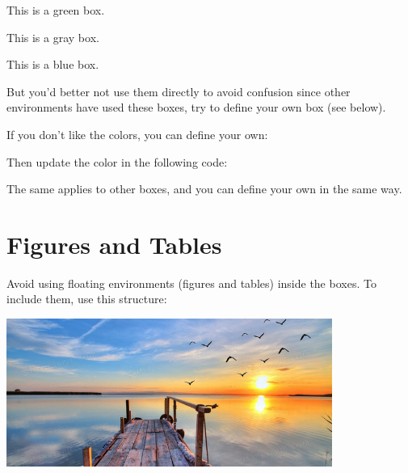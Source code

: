 \documentclass[11pt,a4paper]{article}
\begin{document}
\begin{greenbox}
    This is a green box.
    \end{greenbox}

\begin{graybox}
    This is a gray box.
    \end{graybox}

\begin{bluebox}
    This is a blue box.
    
  \end{bluebox}

{\color{blue} But you'd better not use them directly to avoid confusion since other environments have used these boxes, try to define your own box (see below).}

{\color{blue}If you don’t like the colors, you can define your own:}

\begin{tex}
\end{tex}

{\color{blue}Then update the color in the following code:}

\begin{tex}
\end{tex}

{\color{blue} The same applies to other boxes, and you can define your own in the same way.}




\section{Figures and Tables}

{\color{blue}Avoid using floating environments (figures and tables) inside the boxes. To include them, use this structure:}

\begin{tex}
    \begin{center}
        \includegraphics[width=0.8\textwidth]{image.jpeg}
    \end{center}
\end{tex}
\end{document}
